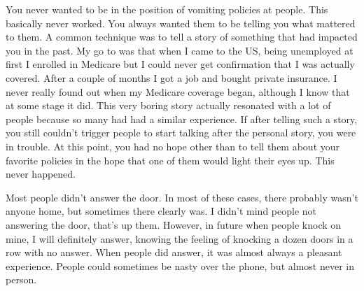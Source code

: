 \documentclass[]{book}
\begin{document}
You never wanted to be in the position of vomiting policies at people. This basically never worked. You always wanted them to be telling you what mattered to them. A common technique was to tell a story of something that had impacted you in the past. My go to was that when I came to the US, being unemployed at first I enrolled in Medicare but I could never get confirmation that I was actually covered. After a couple of months I got a job and bought private insurance. I never really found out when my Medicare coverage began, although I know that at some stage it did. This very boring story actually resonated with a lot of people because so many had had a similar experience. If after telling such a story, you still couldn't trigger people to start talking after the personal story, you were in trouble. At this point, you had no hope other than to tell them about your favorite policies in the hope that one of them would light their eyes up. This never happened.

Most people didn't answer the door. In most of these cases, there probably wasn't anyone home, but sometimes there clearly was. I didn't mind people not answering the door, that's up them. However, in future when people knock on mine, I will definitely answer, knowing the feeling of knocking a dozen doors in a row with no answer. When people did answer, it was almost always a pleasant experience. People could sometimes be nasty over the phone, but almost never in person.
\end{document}
